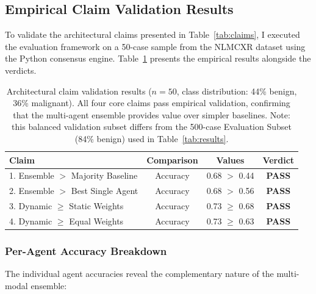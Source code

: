 \documentclass[12pt]{article}
\begin{document}
\subsection{Empirical Claim Validation Results}
\label{subsec:empirical-validation}

To validate the architectural claims presented in Table~\ref{tab:claims}, I executed the evaluation framework on a 50-case sample from the NLMCXR dataset using the Python consensus engine. Table~\ref{tab:validation-results} presents the empirical results alongside the verdicts.

\begin{table}[ht]
\centering
\small
\begin{tabular}{lccc}
\toprule
\textbf{Claim} & \textbf{Comparison} & \textbf{Values} & \textbf{Verdict} \\
\midrule
1. Ensemble $>$ Majority Baseline & Accuracy & 0.68 $>$ 0.44 & \textbf{PASS} \\
2. Ensemble $>$ Best Single Agent & Accuracy & 0.68 $>$ 0.56 & \textbf{PASS} \\
3. Dynamic $\geq$ Static Weights & Accuracy & 0.73 $\geq$ 0.68 & \textbf{PASS} \\
4. Dynamic $\geq$ Equal Weights & Accuracy & 0.73 $\geq$ 0.63 & \textbf{PASS} \\
\bottomrule
\end{tabular}
\caption{Architectural claim validation results ($n=50$, class distribution: 44\% benign, 36\% malignant). All four core claims pass empirical validation, confirming that the multi-agent ensemble provides value over simpler baselines. Note: this balanced validation subset differs from the 500-case Evaluation Subset (84\% benign) used in Table~\ref{tab:results}.}
\label{tab:validation-results}
\end{table}

\subsubsection{Per-Agent Accuracy Breakdown}

The individual agent accuracies reveal the complementary nature of the multi-modal ensemble:
\end{document}
